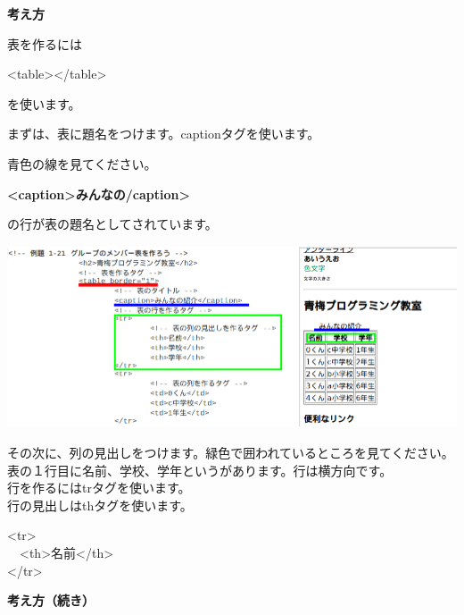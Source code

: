\documentclass[a4paper,12pt]{jarticle}
\begin{document}
\bigskip

\flushleft
\textbf{考え方}



表を作るには

{\textless}table{\textgreater}{\textless}/table{\textgreater}

を使います。

まずは、表に題名をつけます。captionタグを使います。

青色の線を見てください。

\textbf{{\textless}caption{\textgreater}みんなの/caption{\textgreater}}

の行が表の題名としてされています。



\bigskip

\includegraphics[width=13.462cm,height=5.387cm]{textbook-img190.png}


\bigskip

その次に、列の見出しをつけます。緑色で囲われているところを見てください。\\
表の１行目に名前、学校、学年というがあります。行は横方向です。\\
行を作るにはtrタグを使います。\\
行の見出しはthタグを使います。\\


\bigskip

{\textless}tr{\textgreater}\\
\ \ {\textless}th{\textgreater}名前{\textless}/th{\textgreater}\\
{\textless}/tr{\textgreater}\\

\bigskip

\clearpage
\textbf{考え方（続き）}



\bigskip

\bigskip
\end{document}
